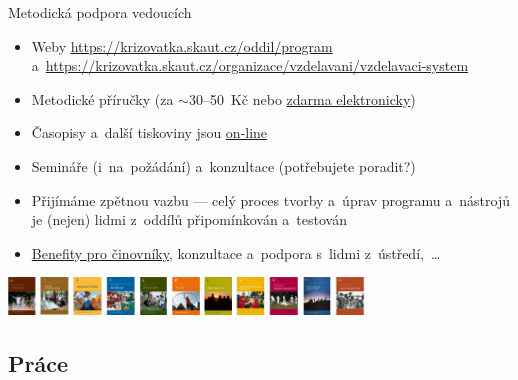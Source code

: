 \documentclass[compress, ucs, xelatex, 11pt, xcolor=dvipsnames, print, aspectratio=169,
	hyperref={
		bookmarks=true,
		unicode=true,
		colorlinks=true,
		pdftitle={Skautska vychovna metoda},
		plainpages=false,
		pdfauthor={Vojtech Zeisek},
		pdfsubject={Skautska vychovna metoda a jeji vyvoj za posledni stoleti a desetileti},
		pdfcreator={XeLaTeX},
		pdfkeywords={Junak, Pedagogika, Skaut, Skauting, Vychovna metoda},
		linkcolor=Red, %
		anchorcolor=ForestGreen, %
		citecolor=ForestGreen, %
		filecolor=ForestGreen, %
		menucolor=ForestGreen, %
		urlcolor=Sepia, %
		pdftex},
	url={hyphens, lowtilde} %
	]{beamer}
\begin{document}
\begin{frame}{Metodická podpora vedoucích}
	\begin{itemize}
		\item Weby \url{https://krizovatka.skaut.cz/oddil/program} a~\url{https://krizovatka.skaut.cz/organizace/vzdelavani/vzdelavaci-system}
		\item Metodické příručky (za $\sim$30--50~Kč nebo \href{https://www.obchod.skaut.cz/index.php?tpl=&_artperpage=99&cl=alist&searchparam=&cnid=701}{zdarma elektronicky})
		\item Časopisy a~další tiskoviny jsou \href{https://casopisy.skaut.cz/}{on-line}
		\item Semináře (i~na~požádání) a~konzultace (potřebujete poradit?)
		\item Přijímáme zpětnou vazbu --- celý proces tvorby a~úprav programu a~nástrojů je (nejen) lidmi z~oddílů připomínkován a~testován
		\item \href{https://krizovatka.skaut.cz/organizace/benefity}{Benefity pro činovníky}, konzultace a~podpora s~lidmi z~ústředí,~\ldots
	\end{itemize}
	\begin{center}
		\includegraphics[height=1cm]{prirucky.png}
	\end{center}
\end{frame}

\subsection{Práce}
\end{document}
